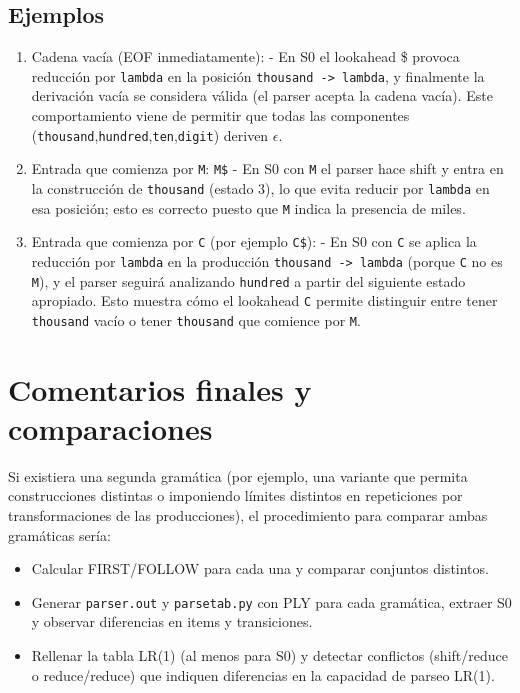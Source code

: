 \documentclass[a4paper,11pt]{article}
\begin{document}
\subsection*{Ejemplos}
\begin{enumerate}
\item Cadena vacía (EOF inmediatamente):
  - En S0 el lookahead \$ provoca reducción por \texttt{lambda} en la posición \texttt{thousand -> lambda}, y finalmente la derivación vacía se considera válida (el parser acepta la cadena vacía). Este comportamiento viene de permitir que todas las componentes (\texttt{thousand},\texttt{hundred},\texttt{ten},\texttt{digit}) deriven $\epsilon$.
\item Entrada que comienza por \texttt{M}: \texttt{M\$}
  - En S0 con \texttt{M} el parser hace shift y entra en la construcción de \texttt{thousand} (estado 3), lo que evita reducir por \texttt{lambda} en esa posición; esto es correcto puesto que \texttt{M} indica la presencia de miles.
\item Entrada que comienza por \texttt{C} (por ejemplo \texttt{C\$}):
  - En S0 con \texttt{C} se aplica la reducción por \texttt{lambda} en la producción \texttt{thousand -> lambda} (porque \texttt{C} no es \texttt{M}), y el parser seguirá analizando \texttt{hundred} a partir del siguiente estado apropiado. Esto muestra cómo el lookahead \texttt{C} permite distinguir entre tener \texttt{thousand} vacío o tener \texttt{thousand} que comience por \texttt{M}.
\end{enumerate}

\section*{Comentarios finales y comparaciones}
Si existiera una segunda gramática (por ejemplo, una variante que permita construcciones distintas o imponiendo límites distintos en repeticiones por transformaciones de las producciones), el procedimiento para comparar ambas gramáticas sería:
\begin{itemize}
\item Calcular FIRST/FOLLOW para cada una y comparar conjuntos distintos.
\item Generar \texttt{parser.out} y \texttt{parsetab.py} con PLY para cada gramática, extraer S0 y observar diferencias en items y transiciones.
\item Rellenar la tabla LR(1) (al menos para S0) y detectar conflictos (shift/reduce o reduce/reduce) que indiquen diferencias en la capacidad de parseo LR(1).
\end{itemize}
\end{document}
